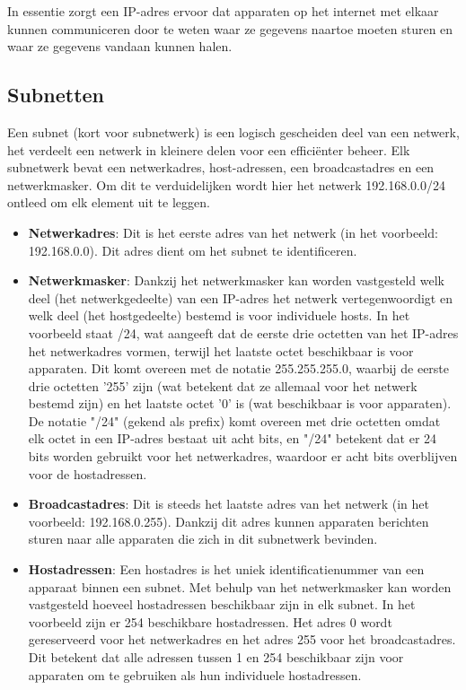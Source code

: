 In essentie zorgt een IP-adres ervoor dat apparaten op het internet met elkaar kunnen communiceren door te weten waar ze gegevens naartoe moeten sturen en waar ze gegevens vandaan kunnen halen.

\subsection{Subnetten}
Een subnet (kort voor subnetwerk) is een logisch gescheiden deel van een netwerk, het verdeelt een netwerk in kleinere delen voor een efficiënter beheer. Elk subnetwerk bevat een netwerkadres, host-adressen, een broadcastadres en een netwerkmasker. Om dit te verduidelijken wordt hier het netwerk 192.168.0.0/24 ontleed om elk element uit te leggen.

\begin{itemize}
    \item \textbf{Netwerkadres}: Dit is het eerste adres van het netwerk (in het voorbeeld: 192.168.0.0). Dit adres dient om het subnet te identificeren.
    \item \textbf{Netwerkmasker}: Dankzij het netwerkmasker kan worden vastgesteld welk deel (het netwerkgedeelte) van een IP-adres het netwerk vertegenwoordigt en welk deel (het hostgedeelte) bestemd is voor individuele hosts. In het voorbeeld staat /24, wat aangeeft dat de eerste drie octetten van het IP-adres het netwerkadres vormen, terwijl het laatste octet beschikbaar is voor apparaten. Dit komt overeen met de notatie 255.255.255.0, waarbij de eerste drie octetten '255' zijn (wat betekent dat ze allemaal voor het netwerk bestemd zijn) en het laatste octet '0' is (wat beschikbaar is voor apparaten). De notatie "/24" (gekend als prefix) komt overeen met drie octetten omdat elk octet in een IP-adres bestaat uit acht bits, en "/24" betekent dat er 24 bits worden gebruikt voor het netwerkadres, waardoor er acht bits overblijven voor de hostadressen.      
    \item \textbf{Broadcastadres}: Dit is steeds het laatste adres van het netwerk (in het voorbeeld: 192.168.0.255). Dankzij dit adres kunnen apparaten berichten sturen naar alle apparaten die zich in dit subnetwerk bevinden.
    \item \textbf{Hostadressen}: Een hostadres is het uniek identificatienummer van een apparaat binnen een subnet. Met behulp van het netwerkmasker kan worden vastgesteld hoeveel hostadressen beschikbaar zijn in elk subnet. In het voorbeeld zijn er 254 beschikbare hostadressen. Het adres 0 wordt gereserveerd voor het netwerkadres en het adres 255 voor het broadcastadres. Dit betekent dat alle adressen tussen 1 en 254 beschikbaar zijn voor apparaten om te gebruiken als hun individuele hostadressen.
\end{itemize}


